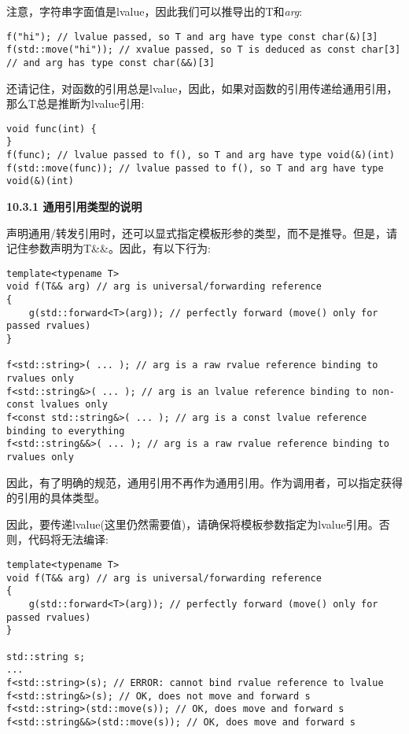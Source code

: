 注意，字符串字面值是lvalue，因此我们可以推导出的T和\textit{arg}:\par

\begin{lstlisting}[caption={}]
f("hi"); // lvalue passed, so T and arg have type const char(&)[3]
f(std::move("hi")); // xvalue passed, so T is deduced as const char[3]
// and arg has type const char(&&)[3]
\end{lstlisting}

还请记住，对函数的引用总是lvalue，因此，如果对函数的引用传递给通用引用，那么T总是推断为lvalue引用:\par

\begin{lstlisting}[caption={}]
void func(int) {
}
f(func); // lvalue passed to f(), so T and arg have type void(&)(int)
f(std::move(func)); // lvalue passed to f(), so T and arg have type void(&)(int)
\end{lstlisting}

\hspace*{\fill} \par %
\textbf{10.3.1 通用引用类型的说明}

声明通用/转发引用时，还可以显式指定模板形参的类型，而不是推导。但是，请记住参数声明为T\&\&。因此，有以下行为:\par

\begin{lstlisting}[caption={}]
template<typename T>
void f(T&& arg) // arg is universal/forwarding reference
{
	g(std::forward<T>(arg)); // perfectly forward (move() only for passed rvalues)
}

f<std::string>( ... ); // arg is a raw rvalue reference binding to rvalues only
f<std::string&>( ... ); // arg is an lvalue reference binding to non-const lvalues only
f<const std::string&>( ... ); // arg is a const lvalue reference binding to everything
f<std::string&&>( ... ); // arg is a raw rvalue reference binding to rvalues only
\end{lstlisting}

因此，有了明确的规范，通用引用不再作为通用引用。作为调用者，可以指定获得的引用的具体类型。\par

因此，要传递lvalue(这里仍然需要值)，请确保将模板参数指定为lvalue引用。否则，代码将无法编译:\par

\begin{lstlisting}[caption={}]
template<typename T>
void f(T&& arg) // arg is universal/forwarding reference
{
	g(std::forward<T>(arg)); // perfectly forward (move() only for passed rvalues)
}

std::string s;
...
f<std::string>(s); // ERROR: cannot bind rvalue reference to lvalue
f<std::string&>(s); // OK, does not move and forward s
f<std::string>(std::move(s)); // OK, does move and forward s
f<std::string&&>(std::move(s)); // OK, does move and forward s
\end{lstlisting}

